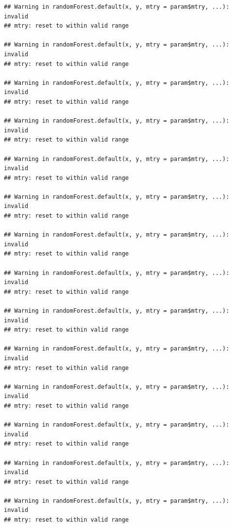 \documentclass[]{article}
\newenvironment{Shaded}{\begin{snugshade}}{\end{snugshade}}
\newcommand{\CommentTok}[1]{\textcolor[rgb]{0.56,0.35,0.01}{\textit{#1}}}
\newcommand{\DataTypeTok}[1]{\textcolor[rgb]{0.13,0.29,0.53}{#1}}
\newcommand{\DecValTok}[1]{\textcolor[rgb]{0.00,0.00,0.81}{#1}}
\newcommand{\KeywordTok}[1]{\textcolor[rgb]{0.13,0.29,0.53}{\textbf{#1}}}
\newcommand{\NormalTok}[1]{#1}
\newcommand{\OperatorTok}[1]{\textcolor[rgb]{0.81,0.36,0.00}{\textbf{#1}}}
\newcommand{\OtherTok}[1]{\textcolor[rgb]{0.56,0.35,0.01}{#1}}
\newcommand{\StringTok}[1]{\textcolor[rgb]{0.31,0.60,0.02}{#1}}
\begin{document}
\begin{verbatim}
## Warning in randomForest.default(x, y, mtry = param$mtry, ...): invalid
## mtry: reset to within valid range

## Warning in randomForest.default(x, y, mtry = param$mtry, ...): invalid
## mtry: reset to within valid range

## Warning in randomForest.default(x, y, mtry = param$mtry, ...): invalid
## mtry: reset to within valid range

## Warning in randomForest.default(x, y, mtry = param$mtry, ...): invalid
## mtry: reset to within valid range

## Warning in randomForest.default(x, y, mtry = param$mtry, ...): invalid
## mtry: reset to within valid range

## Warning in randomForest.default(x, y, mtry = param$mtry, ...): invalid
## mtry: reset to within valid range

## Warning in randomForest.default(x, y, mtry = param$mtry, ...): invalid
## mtry: reset to within valid range

## Warning in randomForest.default(x, y, mtry = param$mtry, ...): invalid
## mtry: reset to within valid range

## Warning in randomForest.default(x, y, mtry = param$mtry, ...): invalid
## mtry: reset to within valid range

## Warning in randomForest.default(x, y, mtry = param$mtry, ...): invalid
## mtry: reset to within valid range

## Warning in randomForest.default(x, y, mtry = param$mtry, ...): invalid
## mtry: reset to within valid range

## Warning in randomForest.default(x, y, mtry = param$mtry, ...): invalid
## mtry: reset to within valid range

## Warning in randomForest.default(x, y, mtry = param$mtry, ...): invalid
## mtry: reset to within valid range

## Warning in randomForest.default(x, y, mtry = param$mtry, ...): invalid
## mtry: reset to within valid range
\end{verbatim}

\begin{Shaded}
\end{Shaded}
\end{document}
